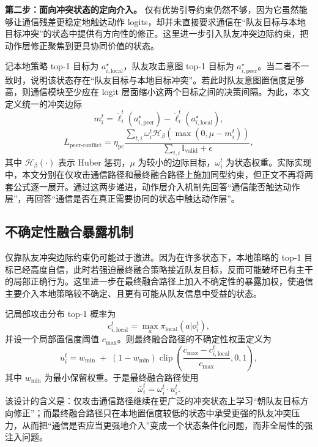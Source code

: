 \textbf{第二步：面向冲突状态的定向介入。} 仅有优势引导约束仍然不够，因为它虽然能够让通信残差更稳定地触达动作 logits，却并未直接要求通信在“队友目标与本地目标冲突”的状态中提供有方向性的修正。这里进一步引入队友冲突边际约束，把动作层修正聚焦到更具协同价值的状态。

记本地策略 top-1 目标为 \(a_{i,\text{local}}^{\star}\)，队友攻击意图 top-1 目标为 \(a_{i,\text{peer}}^{\star}\)。当二者不一致时，说明该状态存在“队友目标与本地目标冲突”。若此时队友意图置信度足够高，则通信模块至少应在 logit 层面缩小这两个目标之间的决策间隔。为此，本文定义统一的冲突边际
\begin{equation}
m_i^t =
\tilde{\ell}_i^t(a_{i,\text{peer}}^{\star})
-
\tilde{\ell}_i^t(a_{i,\text{local}}^{\star}),
\end{equation}
\begin{equation}
L_{\text{peer-conflict}}
=
\eta_{\text{pc}}
\frac{
\sum_{t,i}
\omega_i^t
\mathcal{H}_{\beta}
\left(
\max(0,\mu-m_i^t)
\right)
}{
\sum_{t,i}\mathbb{I}_{\text{valid}} + \epsilon
},
\end{equation}
其中 $\mathcal{H}_{\beta}(\cdot)$ 表示 Huber 惩罚，$\mu$ 为较小的边际目标，$\omega_i^t$ 为状态权重。实际实现中，本文分别在仅攻击通信路径和最终融合路径上施加同型约束，但正文不再将两套公式逐一展开。通过这两步递进，动作层介入机制先回答“通信能否触达动作层”，再回答“通信是否在真正需要协同的状态中触达动作层”。

\subsection{不确定性融合暴露机制}

仅靠队友冲突边际约束仍可能过于激进。因为在许多状态下，本地策略的 top-1 目标已经高度自信，此时若强迫最终融合策略接近队友目标，反而可能破坏已有主干的局部正确行为。这里进一步在最终融合路径上加入不确定性的暴露加权，使通信主要介入本地策略较不确定、且更有可能从队友信息中受益的状态。

记局部攻击分布 top-1 概率为
\begin{equation}
c_{i,\text{local}}^t = \max_a \pi_{\text{local}}(a|o_i^t),
\end{equation}
并设一个局部置信度阈值 $c_{\max}$。则最终融合路径的不确定性权重定义为
\begin{equation}
u_i^t =
w_{\min}
\;+\;(1-w_{\min})
\operatorname{clip}
\left(
\frac{c_{\max}-c_{i,\text{local}}^t}{c_{\max}},
0,1
\right),
\end{equation}
其中 $w_{\min}$ 为最小保留权重。于是最终融合路径使用
\begin{equation}
\bar{\omega}_i^t = \omega_i^t \cdot u_i^t.
\end{equation}
该设计的含义是：仅攻击通信路径继续在更广泛的冲突状态上学习“朝队友目标方向修正”；而最终融合路径只在本地置信度较低的状态中承受更强的队友冲突压力，从而把“通信是否应当更强地介入”变成一个状态条件化问题，而非全局性的强注入问题。

